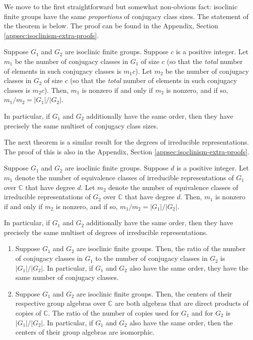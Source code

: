 We move to the first straightforward but somewhat non-obvious fact:
isoclinic finite groups have the same {\em proportions} of conjugacy
class sizes. The statement of the theorem is below. The proof can be
found in the Appendix, Section \ref{appsec:isoclinism-extra-proofs}.

\begin{theorem}\label{isoclinic-same-proportions-conjugacy-class-sizes}
  Suppose $G_1$ and $G_2$ are isoclinic finite groups. Suppose $c$ is
  a positive integer. Let $m_1$ be the number of conjugacy classes in
  $G_1$ of size $c$ (so that the {\em total} number of elements in
  such conjugacy classes is $m_1c$). Let $m_2$ be the number of
  conjugacy classes in $G_2$ of size $c$ (so that the {\em total}
  number of elements in such conjugacy classes is $m_2c$). Then, $m_1$
  is nonzero if and only if $m_2$ is nonzero, and if so, $m_1/m_2 =
  |G_1|/|G_2|$.

  In particular, if $G_1$ and $G_2$ additionally have the same order,
  then they have precisely the same multiset of conjugacy class sizes.
\end{theorem}

The next theorem is a similar result for the degrees of irreducible
representations. The proof of this is also in the Appendix, Section
\ref{appsec:isoclinism-extra-proofs}.

\begin{theorem}\label{isoclinic-same-proportions-irrep-degrees}
  Suppose $G_1$ and $G_2$ are isoclinic finite groups. Suppose $d$ is
  a positive integer. Let $m_1$ denote the number of equivalence
  classes of irreducible representations of $G_1$ over $\mathbb{C}$
  that have degree $d$. Let $m_2$ denote the number of equivalence
  classes of irreducible representations of $G_2$ over $\mathbb{C}$
  that have degree $d$. Then, $m_1$ is nonzero if and only if $m_2$ is
  nonzero, and if so, $m_1/m_2 = |G_1|/|G_2|$.

  In particular, if $G_1$ and $G_2$ additionally have the same order,
  then they have precisely the same multiset of degrees of irreducible
  representations.
\end{theorem}

\begin{theorem}
  \begin{enumerate}
  \item Suppose $G_1$ and $G_2$ are isoclinic finite groups. Then, the
    ratio of the number of conjugacy classes in $G_1$ to the number of
    conjugacy classes in $G_2$ is $|G_1|/|G_2|$. In particular, if
    $G_1$ and $G_2$ also have the same order, they have the same
    number of conjugacy classes.
  \item Suppose $G_1$ and $G_2$ are isoclinic finite groups. Then, the
    centers of their respective group algebras over $\mathbb{C}$ are
    both algebras that are direct products of copies of
    $\mathbb{C}$. The ratio of the number of copies used for $G_1$ and
    for $G_2$ is $|G_1|/|G_2|$. In particular, if $G_1$ and $G_2$ also
    have the same order, then the centers of their group algebras are
    isomorphic.
  \end{enumerate}
\end{theorem}

